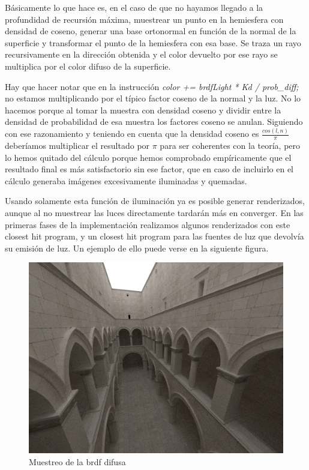 Básicamente lo que hace es, en el caso de que no hayamos llegado a la profundidad de recursión máxima, muestrear un punto en la hemiesfera con densidad de coseno, generar una base ortonormal en función de la normal de la superficie y transformar el punto de la hemiesfera con esa base. Se traza un rayo recursivamente en la dirección obtenida y el color devuelto por ese rayo se multiplica por el color difuso de la superficie.

\medskip

Hay que hacer notar que en la instrucción \emph{color += brdfLight * Kd / prob\_diff;} no estamos multiplicando por el típico factor coseno de la normal y la luz. No lo hacemos porque al tomar la muestra con densidad coseno y dividir entre la densidad de probabilidad de esa muestra los factores coseno se anulan.
Siguiendo con ese razonamiento y teniendo en cuenta que la densidad coseno es $\frac{cos(l,n)}{\pi}$ deberíamos multiplicar el resultado por $\pi$ para ser coherentes con la teoría, pero lo hemos quitado del cálculo porque hemos comprobado empíricamente que el resultado final es más satisfactorio sin ese factor, que en caso de incluirlo en el cálculo generaba imágenes excesivamente iluminadas y quemadas.

\medskip

Usando solamente esta función de iluminación ya es posible generar renderizados, aunque al no muestrear las luces directamente tardarán más en converger.
En las primeras fases de la implementación realizamos algunos renderizados con este closest hit program, y un closest hit program para las fuentes de luz que devolvía su emisión de luz. Un ejemplo de ello puede verse en la siguiente figura.


\begin{figure}[h]
\centering
\includegraphics[width=5in]{dome1.png}
\caption{Muestreo de la brdf difusa}
\end{figure}

